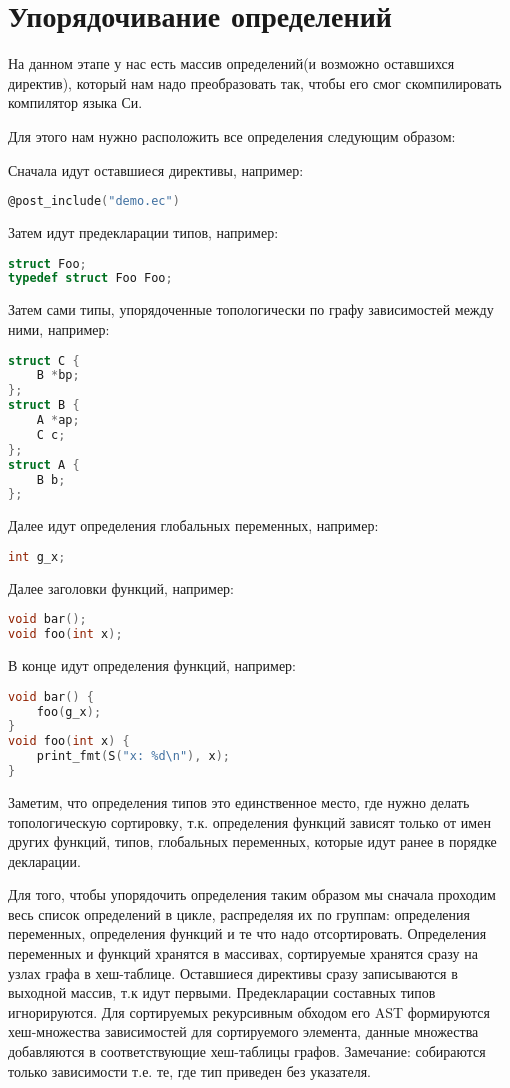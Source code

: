 
\clearpage
\section{Упорядочивание определений}
\label{pass:ordering}

На данном этапе у нас есть массив определений(и возможно оставшихся директив), 
который нам надо преобразовать так, чтобы его смог скомпилировать компилятор языка Си.

Для этого нам нужно расположить все определения следующим образом:

Сначала идут оставшиеся директивы, например:
\begin{lstlisting}[language=c]
@post_include("demo.ec")    
\end{lstlisting}

Затем идут предекларации типов, например:
\begin{lstlisting}[language=c]
struct Foo;
typedef struct Foo Foo;
\end{lstlisting}

Затем сами типы, упорядоченные топологически по графу зависимостей между ними, например:
\begin{lstlisting}[language=c]
struct C {
    B *bp;
};
struct B {
    A *ap;
    C c;
};
struct A {
    B b;
};
\end{lstlisting}

Далее идут определения глобальных переменных, например:
\begin{lstlisting}[language=c]
int g_x;
\end{lstlisting}

Далее заголовки функций, например:
\begin{lstlisting}[language=c]
void bar();
void foo(int x);
\end{lstlisting}

В конце идут определения функций, например:
\begin{lstlisting}[language=c]
void bar() {
    foo(g_x);
}
void foo(int x) {
    print_fmt(S("x: %d\n"), x);
}
\end{lstlisting}

Заметим, что определения типов это единственное место, где нужно делать топологическую сортировку, 
т.к. определения функций зависят только от имен других функций, типов, глобальных переменных, которые идут ранее в порядке декларации.

Для того, чтобы упорядочить определения таким образом мы сначала проходим весь список определений в цикле, распределяя их по группам:
определения переменных, определения функций и те что надо отсортировать. Определения переменных и функций хранятся в массивах, сортируемые хранятся сразу на узлах графа в хеш-таблице.
Оставшиеся директивы сразу записываются в выходной массив, т.к идут первыми. Предекларации составных типов игнорируются.
Для сортируемых рекурсивным обходом его AST формируются хеш-множества зависимостей для сортируемого элемента, данные множества добавляются в соответствующие хеш-таблицы графов.
Замечание: собираются только  зависимости т.е. те, где тип приведен без указателя.

